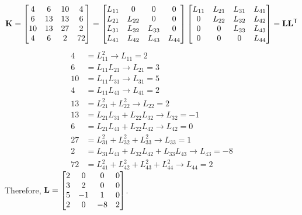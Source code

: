 \begin{example}
\begin{equation*}
  \mathbf{K} = \begin{bmatrix}4 & 6 & 10 & 4\\ 6 & 13 & 13 & 6\\ 10 & 13 & 27 & 2\\ 4 & 6 & 2 & 72\end{bmatrix}
  = \begin{bmatrix}L_{11} & 0 & 0 & 0\\ L_{21} & L_{22} & 0 & 0\\ L_{31} & L_{32} & L_{33} & 0\\ L_{41} & L_{42} & L_{43} & L_{44}\end{bmatrix}
    \begin{bmatrix}L_{11} & L_{21} & L_{31} & L_{41}\\ 0 & L_{22} & L_{32} & L_{42}\\ 0 & 0 & L_{33} & L_{43}\\ 0 & 0 & 0 & L_{44}\end{bmatrix} = \mathbf{L}\mathbf{L}^{\mathsf{T}}
\end{equation*}
\begin{align*}
  4 &= L_{11}^2 \rightarrow L_{11} = 2\\
  6 &= L_{11}L_{21} \rightarrow L_{21} = 3\\
  10 &= L_{11}L_{31} \rightarrow L_{31} = 5\\
  4 &= L_{11}L_{41} \rightarrow L_{41} = 2\\
  13 &= L_{21}^2 + L_{22}^2 \rightarrow L_{22} = 2\\
  13 &= L_{21}L_{31} + L_{22}L_{32} \rightarrow L_{32} = -1\\
  6 &= L_{21}L_{41} + L_{22}L_{42} \rightarrow L_{42} = 0\\
  27 &= L_{31}^2 + L_{32}^2 + L_{33}^2 \rightarrow L_{33} = 1\\
  2 &= L_{31}L_{41} + L_{32}L_{42} + L_{33}L_{43} \rightarrow L_{43} = -8\\
  72 &= L_{41}^2 + L_{42}^2 + L_{43}^2 + L_{44}^2 \rightarrow L_{44} = 2
\end{align*}
Therefore, $\mathbf{L} = \begin{bmatrix}2 & 0 & 0 & 0\\ 3 & 2 & 0 & 0\\ 5 & -1 & 1 & 0\\ 2 & 0 & -8 & 2\end{bmatrix}$.
\end{example}


